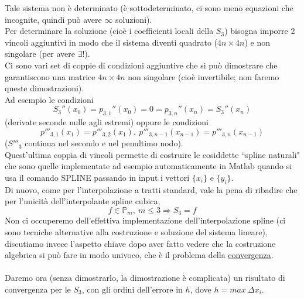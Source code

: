 Tale sistema non è determinato (è sottodeterminato, ci sono meno equazioni che incognite, quindi può avere $\infty$ soluzioni).\\
Per determinare la soluzione (cioè i coefficienti locali della $S_3$) bisogna imporre 2 vincoli aggiuntivi in modo che il sistema diventi quadrato ($4n \times 4n$) e non singolare (per avere $\exists!$).\\
Ci sono vari set di coppie di condizioni  aggiuntive che si può dimostrare che garantiscono una matrice $4n \times 4n$ non singolare (cioè invertibile; non faremo queste dimostrazioni).\\
Ad esempio le condizioni 
\begin{equation*}
    S_3''(x_0)=p_{3,1}''(x_0)=0=p_{3,n}''(x_n)=S_3''(x_n)
\end{equation*}
(derivate seconde nulle agli estremi) oppure le condizioni
\[
p'''_{3,1}(x_1) = p'''_{3,2}(x_1), \ p'''_{3,n-1}(x_{n-1}) = p'''_{3,n} (x_{n-1})
\]
($S'''_3$ continua nel secondo e nel penultimo nodo).\\
Quest'ultima coppia di vincoli permette di costruire le cosiddette ``spline naturali" che sono quelle implementate ad esempio automaticamente in Matlab quando si usa il comando SPLINE passando in input i vettori $\{x_i \}$ e $\{ y_i \}$.\\
Di nuovo, come per l'interpolazione a tratti standard, vale la pena di ribadire che per l'unicità dell'interpolante spline cubica,
\[
f \in \mathbb{P}_m, \ m \leq 3 \Rightarrow S_3 = f
\]
Non ci occuperemo dell'effettiva implementazione dell'interpolazione spline (ci sono tecniche alternative alla costruzione e soluzione del sistema lineare), discutiamo invece l'aspetto chiave dopo aver fatto vedere che la costruzione algebrica si può fare in modo univoco, che è il problema della \uline{convergenza}.\\\\
Daremo ora (senza dimostrarlo, la dimostrazione è complicata) un risultato di convergenza per le $S_3$, con gli ordini dell'errore in $h$, dove $h = max \ \Delta x_i$.


